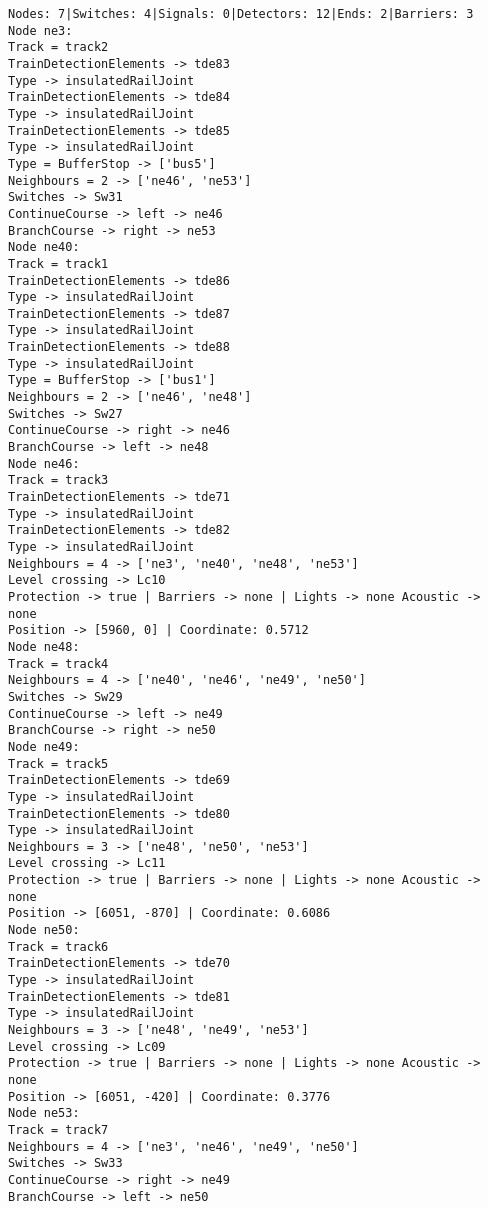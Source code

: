	\begin{lstlisting}[language = {}, caption = Infrastructure.RNA, label = {lst:EJ9_4}]
Nodes: 7|Switches: 4|Signals: 0|Detectors: 12|Ends: 2|Barriers: 3
Node ne3:
Track = track2
TrainDetectionElements -> tde83
Type -> insulatedRailJoint
TrainDetectionElements -> tde84
Type -> insulatedRailJoint
TrainDetectionElements -> tde85
Type -> insulatedRailJoint
Type = BufferStop -> ['bus5']
Neighbours = 2 -> ['ne46', 'ne53']
Switches -> Sw31
ContinueCourse -> left -> ne46
BranchCourse -> right -> ne53
Node ne40:
Track = track1
TrainDetectionElements -> tde86
Type -> insulatedRailJoint
TrainDetectionElements -> tde87
Type -> insulatedRailJoint
TrainDetectionElements -> tde88
Type -> insulatedRailJoint
Type = BufferStop -> ['bus1']
Neighbours = 2 -> ['ne46', 'ne48']
Switches -> Sw27
ContinueCourse -> right -> ne46
BranchCourse -> left -> ne48
Node ne46:
Track = track3
TrainDetectionElements -> tde71
Type -> insulatedRailJoint
TrainDetectionElements -> tde82
Type -> insulatedRailJoint
Neighbours = 4 -> ['ne3', 'ne40', 'ne48', 'ne53']
Level crossing -> Lc10
Protection -> true | Barriers -> none | Lights -> none Acoustic -> none
Position -> [5960, 0] | Coordinate: 0.5712
Node ne48:
Track = track4
Neighbours = 4 -> ['ne40', 'ne46', 'ne49', 'ne50']
Switches -> Sw29
ContinueCourse -> left -> ne49
BranchCourse -> right -> ne50
Node ne49:
Track = track5
TrainDetectionElements -> tde69
Type -> insulatedRailJoint
TrainDetectionElements -> tde80
Type -> insulatedRailJoint
Neighbours = 3 -> ['ne48', 'ne50', 'ne53']
Level crossing -> Lc11
Protection -> true | Barriers -> none | Lights -> none Acoustic -> none
Position -> [6051, -870] | Coordinate: 0.6086
Node ne50:
Track = track6
TrainDetectionElements -> tde70
Type -> insulatedRailJoint
TrainDetectionElements -> tde81
Type -> insulatedRailJoint
Neighbours = 3 -> ['ne48', 'ne49', 'ne53']
Level crossing -> Lc09
Protection -> true | Barriers -> none | Lights -> none Acoustic -> none
Position -> [6051, -420] | Coordinate: 0.3776
Node ne53:
Track = track7
Neighbours = 4 -> ['ne3', 'ne46', 'ne49', 'ne50']
Switches -> Sw33
ContinueCourse -> right -> ne49
BranchCourse -> left -> ne50
	\end{lstlisting}	
	